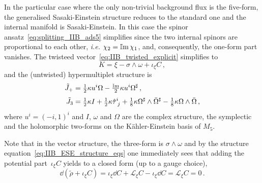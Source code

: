 \documentclass[debug]{phd}
\begin{document}
In the particular case where the only non-trivial background flux is the five-form, the generalised Sasaki-Einstein structure reduces to the standard one and the internal manifold is Sasaki-Einstein.
In this case the spinor ansatz~\eqref{eq:splitting_IIB_ads5} simplifies since the two internal spinors are proportional to each other, \emph{i.e.} $\chi_2=\operatorname{\mathbb{I}m} \chi_1$, and, consequently, the one-form part vanishes.
The twisteed vector~\eqref{eq:IIB_twisted_explicit} simplifies to
%
	\begin{equation} 
		K = \xi - \sigma \wedge \omega + \iota_{\xi}C\, , 
	\end{equation}  
%
and the (untwisted) hypermultiplet structure is~\cite{AshmoreESE}
%
	\begin{align}
	\label{Jstruct}
		\tilde{J}_+ &= \tfrac{1}{2}\kappa u^i \Omega - \tfrac{\operatorname{\mathbb{I}m}}{2} \kappa u^i \Omega^{\sharp}\, ,\\[1mm]
		\tilde{J}_3 &= \tfrac{1}{2}\kappa I + \tfrac{1}{2} \kappa \hat{\tau}^{i}_{\phantom{i}j} + \tfrac{1}{8}\kappa \Omega^{\sharp}\wedge \bar{\Omega}^{\sharp} - \tfrac{1}{8}\kappa \Omega \wedge \bar{\Omega} \, , 
	\end{align}
where $u^i = (-i, 1)^i$ and $I$, $\omega$ and $\Omega$ are the complex structure, the symplectic and the holomorphic two-forms on the K\"ahler-Einstein basis of $M_5$. 

Note that in the vector structure, the three-form is $\sigma \wedge \omega$ and by the structure equation~\eqref{eq:IIB_ESE_structure_eqs} one immediately sees that adding the potential part~$\iota_{\xi}C$ yields to a closed form (up to a gauge choice),
%
	\begin{equation} 
		\dd  \left( \tilde{\rho}+\iota_{\xi}C \right)= \iota_{\xi} \dd  C + \mathcal{L}_{\xi} C - \iota_{\xi} \dd  C = \mathcal{L}_{\xi} C = 0\, .
	\end{equation} 
%
\end{document}
